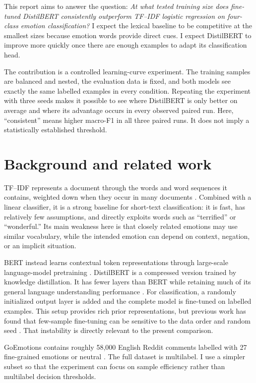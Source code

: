 \documentclass[11pt,a4paper]{article}
\begin{document}
This report aims to answer the question: \emph{At what tested training size does
fine-tuned DistilBERT consistently outperform TF--IDF logistic regression on
four-class emotion classification?} I expect the lexical baseline to be
competitive at the smallest sizes because emotion words provide direct cues. I
expect DistilBERT to improve more quickly once there are enough examples to
adapt its classification head.

The contribution is a controlled learning-curve experiment. The training samples are balanced and nested,
the evaluation data is fixed, and both models see exactly the same labelled
examples in every condition. Repeating the experiment with three seeds makes it
possible to see where DistilBERT is only better on average and where its
advantage occurs in every observed paired run. Here, ``consistent'' means higher
macro-F1 in all three paired runs. It does not imply a statistically established 
threshold.

\section{Background and related work}

TF--IDF represents a document through the words and word sequences it contains,
weighted down when they occur in many documents \citep{manning2008ir}. Combined
with a linear classifier, it is a strong baseline for short-text classification:
it is fast, has relatively few assumptions, and directly exploits words such as
``terrified'' or ``wonderful.'' Its main weakness here is that closely related
emotions may use similar vocabulary, while the intended emotion can depend on
context, negation, or an implicit situation.

BERT instead learns contextual token representations through large-scale
language-model pretraining \citep{devlin2019bert}. DistilBERT is a compressed
version trained by knowledge distillation. It has fewer layers than BERT while
retaining much of its general language understanding performance
\citep{sanh2019distilbert}. For classification, a randomly initialized output
layer is added and the complete model is fine-tuned on labelled examples. This
setup provides rich prior representations, but previous work has found that
few-sample fine-tuning can be sensitive to the data order and random seed
\citep{zhang2020revisiting}. That instability is directly
relevant to the present comparison.

GoEmotions contains roughly 58,000 English Reddit comments labelled with 27
fine-grained emotions or neutral \citep{demszky2020goemotions}. The full dataset
is multilabel. I use a simpler subset so that the experiment can
focus on sample efficiency rather than multilabel decision thresholds.
\end{document}
